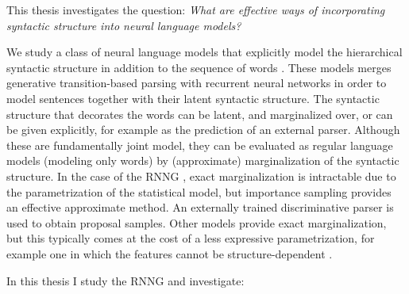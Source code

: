 % 

This thesis investigates the question: \textit{What are effective ways of incorporating syntactic structure into neural language models?}

We study a class of neural language models that explicitly model the hierarchical syntactic structure in addition to the sequence of words \citep{dyer2016rnng,buys2015generative,buys2018exact}. These models merges generative transition-based parsing with recurrent neural networks in order to model sentences together with their latent syntactic structure. The syntactic structure that decorates the words can be latent, and marginalized over, or can be given explicitly, for example as the prediction of an external parser. Although these are fundamentally joint model, they can be evaluated as regular language models (modeling only words) by (approximate) marginalization of the syntactic structure. In the case of the RNNG \citep{dyer2016rnng}, exact marginalization is intractable due to the parametrization of the statistical model, but importance sampling provides an effective approximate method. An externally trained discriminative parser is used to obtain proposal samples. Other models provide exact marginalization, but this typically comes at the cost of a less expressive parametrization, for example one in which the features cannot be structure-dependent \citep{buys2018exact}.

In this thesis I study the RNNG \citep{dyer2016rnng} and investigate:

